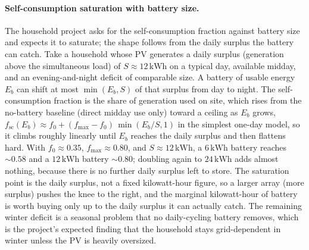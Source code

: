 \paragraph{Self-consumption saturation with battery size.} The household
project asks for the self-consumption fraction against battery size and
expects it to saturate; the shape follows from the daily surplus the
battery can catch. Take a household whose PV generates a daily surplus
(generation above the simultaneous load) of $S \approx 12\,\si{\kilo\watt
\hour}$ on a typical day, available midday, and an evening-and-night deficit
of comparable size. A battery of usable energy $E_b$ can shift at most
$\min(E_b, S)$ of that surplus from day to night. The self-consumption
fraction is the share of generation used on site, which rises from the
no-battery baseline (direct midday use only) toward a ceiling as $E_b$
grows, $f_{\text{sc}}(E_b) \approx f_0 + (f_{\max}-f_0)\,\min(E_b/S, 1)$ in
the simplest one-day model, so it climbs roughly linearly until $E_b$
reaches the daily surplus and then flattens hard. With $f_0 \approx 0.35$,
$f_{\max}\approx 0.80$, and $S \approx 12\,\si{\kilo\watt\hour}$, a $6\,\si{
\kilo\watt\hour}$ battery reaches $\sim 0.58$ and a $12\,\si{\kilo\watt
\hour}$ battery $\sim 0.80$; doubling again to $24\,\si{\kilo\watt\hour}$
adds almost nothing, because there is no further daily surplus left to
store. The saturation point is the daily surplus, not a fixed kilowatt-hour
figure, so a larger array (more surplus) pushes the knee to the right, and
the marginal kilowatt-hour of battery is worth buying only up to the daily
surplus it can actually catch. The remaining winter deficit is a seasonal
problem that no daily-cycling battery removes, which is the project's
expected finding that the household stays grid-dependent in winter unless
the PV is heavily oversized.

